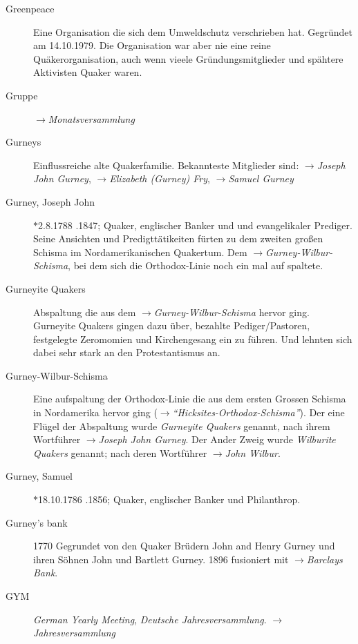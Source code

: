 \begin{description}
 \item[Greenpeace] Eine Organisation die sich dem Umweldschutz verschrieben hat.
 Gegründet am 14.10.1979. Die Organisation war aber nie eine reine
 Quäkerorganisation, auch wenn vieele Gründungsmitglieder und spähtere Aktivisten
 Quaker waren.

\item[Gruppe] $\to$\textit{Monatsversammlung}

\item[Gurneys] Einflussreiche alte Quakerfamilie. Bekannteste Mitglieder sind:
$\to$\textit{Joseph John Gurney}, $\to$\textit{Elizabeth (Gurney) Fry},
$\to$\textit{Samuel Gurney}


\item[Gurney, Joseph John] $\ast$2.8.1788 .1847; Quaker, englischer Banker und
und evangelikaler Prediger. Seine Ansichten und Predigttätikeiten fürten zu
dem zweiten großen Schisma im Nordamerikanischen Quakertum. Dem
$\to$\textit{Gurney-Wilbur-Schisma}, bei dem sich die Orthodox-Linie noch ein
mal auf spaltete.

\item[Gurneyite Quakers] Abspaltung die aus dem $\to$\textit{Gurney-Wilbur-Schisma}
hervor ging. Gurneyite Quakers gingen dazu über, bezahlte Pediger/Pastoren,
festgelegte Zeromomien und Kirchengesang ein zu führen. Und lehnten sich dabei
sehr stark an den Protestantismus an.

\item[Gurney-Wilbur-Schisma]
Eine aufspaltung der Orthodox-Linie die aus dem ersten Grossen Schisma in
Nordamerika hervor ging ($\to$\textit{"`Hicksites-Orthodox-Schisma"'}). Der
eine Flügel der Abspaltung wurde \textit{Gurneyite Quakers} genannt, nach
ihrem Wortführer $\to$\textit{Joseph John Gurney}. Der Ander Zweig wurde
\textit{Wilburite Quakers} genannt; nach deren Wortführer
$\to$\textit{John Wilbur}.


\item[Gurney, Samuel] $\ast$18.10.1786 .1856; Quaker, englischer Banker und
Philanthrop.

\item[Gurney's bank] 1770 Gegrundet von den Quaker Brüdern John and Henry Gurney und
ihren Söhnen John und Bartlett Gurney. 1896 fusioniert mit
$\to$\textit{Barclays Bank}.

\item[GYM] \textit{German Yearly Meeting}, \textit{Deutsche Jahresversammlung}. $\to$\textit{Jahresversammlung}
 \end{description}

\normalsize